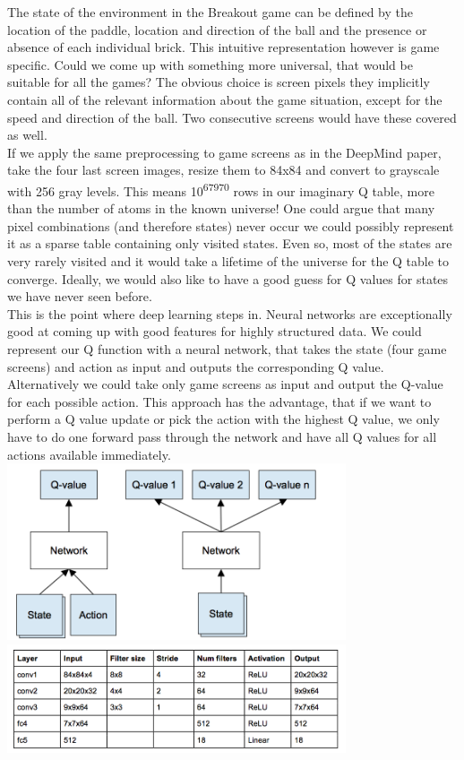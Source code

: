 \documentclass[twoside,letterpaper]{article}
\begin{document}
{\color{black}
The state of the environment in the Breakout game can be defined by the location of the paddle, location and direction of the ball and the presence or absence of each individual brick. This intuitive representation however is game specific. Could we come up with something more universal, that would be suitable for all the games? The obvious choice is screen pixels they implicitly contain all of the relevant information about the game situation, except for the speed and direction of the ball. Two consecutive screens would have these covered as well.\\

If we apply the same preprocessing to game screens as in the DeepMind paper, take the four last screen images, resize them to 84x84 and convert to grayscale with 256 gray levels. This means 10\textsuperscript{67970} rows in our imaginary Q table, more than the number of atoms in the known universe! One could argue that many pixel combinations (and therefore states) never occur we could possibly represent it as a sparse table containing only visited states. Even so, most of the states are very rarely visited and it would take a lifetime of the universe for the Q table to converge. Ideally, we would also like to have a good guess for Q values for states we have never seen before.\\

This is the point where deep learning steps in. Neural networks are exceptionally good at coming up with good features for highly structured data. We could represent our Q function with a neural network, that takes the state (four game screens) and action as input and outputs the corresponding Q value. Alternatively we could take only game screens as input and output the Q-value for each possible action. This approach has the advantage, that if we want to perform a Q value update or pick the action with the highest Q value, we only have to do one forward pass through the network and have all Q values for all actions available immediately.\\
\centering
\includegraphics[width=10cm]{images/deep.png}\\
\bigskip
\centering
\includegraphics[width=10cm]{images/deep2.png}\\
}
\end{document}
